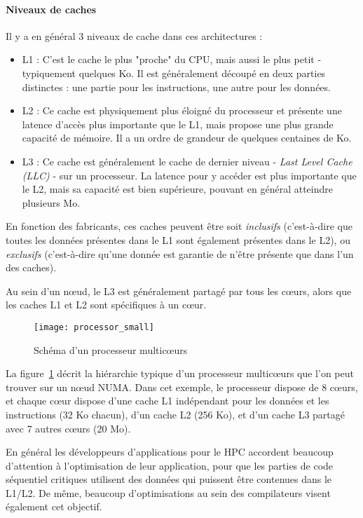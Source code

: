 \paragraph{Niveaux de caches}

Il y a en général 3 niveaux de cache dans ces architectures :
\begin{itemize}
  \item L1 : C'est le cache le plus "proche" du CPU, mais aussi le plus petit - typiquement quelques Ko. Il est généralement découpé en deux parties distinctes : une partie pour les instructions, une autre pour les données.
  \item L2 : Ce cache est physiquement plus éloigné du processeur et présente une latence d'accès plus importante que le L1, mais propose une plus grande capacité de mémoire. Il a un ordre de grandeur de quelques centaines de Ko.
  \item L3 : Ce cache est généralement le cache de dernier niveau - \emph{Last Level Cache (LLC)} - sur un processeur. La latence pour y accéder est plus importante que le L2, mais sa capacité est bien supérieure, pouvant en général atteindre plusieurs Mo.
\end{itemize}

En fonction des fabricants, ces caches peuvent être soit \emph{inclusifs} (c'est-à-dire que toutes les données présentes dans le L1 sont également présentes dans le L2), ou \emph{exclusifs} (c'est-à-dire qu'une donnée est garantie de n'être présente que dans l'un des caches).

Au sein d'un nœud, le L3 est généralement partagé par tous les cœurs, alors que les caches L1 et L2 sont spécifiques à un cœur.

\begin{figure}[ht]
  \centering
  \texttt{[image: processor\_small]}
  \caption{Schéma d'un processeur multicœurs}\label{fig:context:schema-caches}
\end{figure}

La figure~\ref{fig:context:schema-caches} décrit la hiérarchie typique d'un processeur multicœurs que l'on peut trouver sur un nœud NUMA.
Dans cet exemple, le processeur dispose de 8 cœurs, et chaque cœur dispose d'une cache L1 indépendant pour les données et les instructions (32 Ko chacun), d'un cache L2 (256 Ko), et d'un cache L3 partagé avec 7 autres cœurs (20 Mo).


En général les développeurs d'applications pour le HPC accordent beaucoup d'attention à l'optimisation de leur application, pour que les parties de code séquentiel critiques utilisent des données qui puissent être contenues dans le L1/L2.
De même, beaucoup d'optimisations au sein des compilateurs visent également cet objectif.

